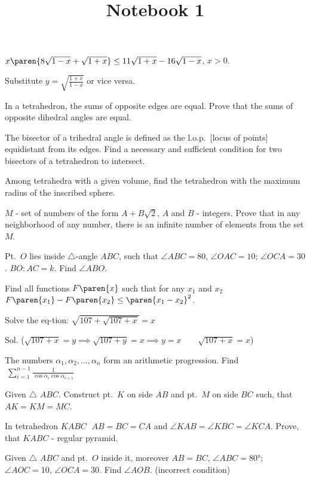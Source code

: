 \documentclass{article}
\title{Notebook 1}
\author{}
\date{}
\newcommand{\strikethrough}[1]{}  %
\begin{document}
\strikethrough{Given $\triangle$ $ABC$ find}


\problem[Problem ]  %
$x \paren{8 \sqrt{1 - x} + \sqrt{1 + x}} \leq 11 \sqrt{1 + x} - 16 \sqrt{1 - x}$, $x > 0$.

Substitute $y = \sqrt{\frac{1 + x}{1 - x}}$ or vice versa.


\problem[Problem ]  %
In a tetrahedron, the sums of opposite edges are equal.
Prove that the sums of opposite dihedral angles are equal.


\problem  %
The bisector of a trihedral angle is defined as the l.o.p.\ [locus of points] equidistant from its edges.
Find a necessary and sufficient condition for two bisectors of a tetrahedron to intersect.


\problem  %
Among tetrahedra with a given volume, find the tetrahedron with the maximum radius of the inscribed sphere.


\problem  %
$M$ - set of numbers of the form $A + B \sqrt{2}$, $A$ and $B$ - integers.
Prove that in any neighborhood of any number, there is an infinite number of elements from the set $M$.


\problem  %
Pt.\ $O$ lies inside $\triangle$-angle $ABC$,
such that $\angle ABC = 80$, $\angle OAC = 10$; $\angle OCA = 30$.
$BO : AC = k$. Find $\angle ABO$.


\problem  %
Find all functions $F\paren{x}$ such that for any $x_1$ and $x_2 \;$
$F\paren{x_1} - F\paren{x_2} \leq \paren{x_1 - x_2}^2$.


\problem  %
Solve the eq-tion: $\sqrt{107 + \sqrt{107 + x}} = x$

Sol.
($\sqrt{107 + x} = y
 \implies
 \sqrt{107 + y} = x
 \implies
 y = x
 \qquad
 \sqrt{107 + x} = x$)


\problem  %
The numbers $\alpha_1, \alpha_2, \dotsc, \alpha_n$ form an arithmetic progression.
Find $\: \displaystyle{\sum\limits_{i = 1}^{n - 1} \frac{1}{\cos\alpha_i \cos\alpha_{i+1}}}$


\problem  %
Given $\triangle$ $ABC$.
Construct pt.\ $K$ on side $AB$ and pt.\ $M$ on side $BC$ such, that $AK = KM = MC$.


\problem  %
In tetrahedron $KABC$ $\; AB = BC = CA$ and $\angle KAB = \angle KBC = \angle KCA$.
Prove, that $KABC$ - regular pyramid.


\problem  %
Given $\triangle$ $ABC$ and pt.\ $O$ inside it,
moreover $AB = BC$, $\angle ABC = \ang{80}$; $\angle AOC = 10$, $\angle OCA = 30$.
Find $\angle AOB$.
(incorrect condition)
\end{document}
